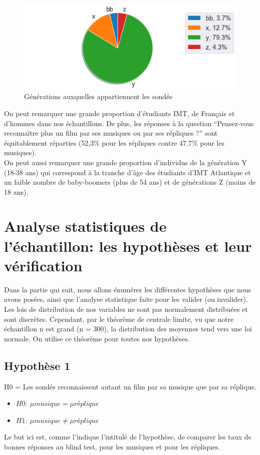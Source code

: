 \documentclass{article} %
\begin{document}
\begin{figure}
	\centering
	\includegraphics[keepaspectratio = true,scale=0.38]{piechar2}
	\caption{Générations auxquelles appartiennent les sondés}
\end{figure}

On peut remarquer une grande proportion d’étudiants IMT, de Français et d’hommes dans nos échantillons. De plus, les réponses à la question “Pensez-vous reconnaître plus un film par ses musiques ou par ses répliques ?” sont équitablement réparties (52,3\% pour les répliques contre 47,7\% pour les musiques).\\
On peut aussi remarquer une grande proportion d’individus de la génération Y (18-38 ans) qui correspond à la tranche d’âge des étudiants d’IMT Atlantique et un faible nombre de baby-boomers (plus de 54 ans) et de générations Z (moins de 18 ans).
\newpage
\section{Analyse statistiques de l'échantillon: les hypothèses et leur vérification}
Dans la partie qui suit, nous allons énumérer les différentes hypothèses que nous avons posées, ainsi que l’analyse statistique faite pour les valider (ou invalider).\\
Les lois de distribution de nos variables ne sont pas normalement distribuées et sont discrètes. Cependant, par le théorème de centrale limite, vu que notre échantillon n est grand (n = 300), la distribution des moyennes tend vers une loi normale. On utilise ce théorème pour toutes nos hypothèses.
\subsection{Hypothèse 1}
H0 = Les sondés reconnaissent autant un film par sa musique que par sa réplique.
\begin{itemize}
	\vspace{-0.2cm}
	\setlength\itemsep{0.0cm}
	\item $H0: \ \mu{musique} = \mu{réplique}$
	\item $H1: \ \mu{musique} \ne \mu{réplique}$
\end{itemize}
Le but ici est, comme l’indique l’intitulé de l’hypothèse, de comparer les taux de bonnes réponses au blind test, pour les musiques et pour les répliques.
\end{document}
